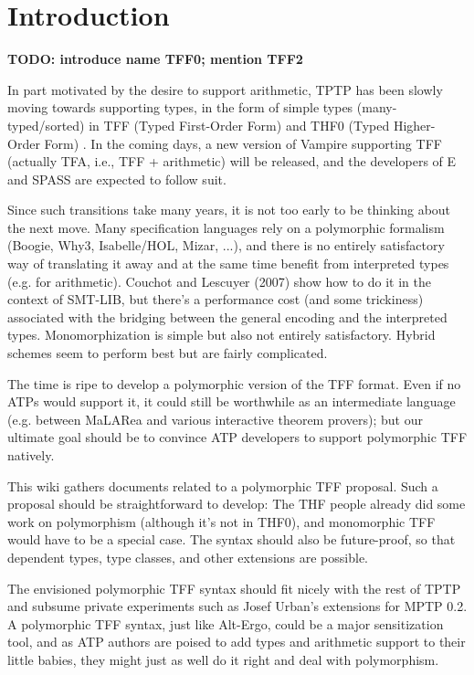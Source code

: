 \section{Introduction}
\label{sec_intro}

\textbf{TODO: introduce name TFF0; mention TFF2}

In part motivated by the desire to support arithmetic, TPTP has been slowly
moving towards supporting types, in the form of simple types (many-typed/sorted)
in TFF (Typed First-Order Form) \cite{TFF0} and THF0 (Typed Higher-Order Form)
\cite{xxx}. In the coming days, a new version of Vampire supporting TFF
(actually TFA, i.e., TFF + arithmetic) will be released, and the developers of E
and SPASS are expected to follow suit.

Since such transitions take many years, it is not too early to be thinking about
the next move. Many specification languages rely on a polymorphic formalism
(Boogie, Why3, Isabelle/HOL, Mizar, ...), and there is no entirely satisfactory
way of translating it away and at the same time benefit from interpreted types
(e.g. for arithmetic). Couchot and Lescuyer (2007) show how to do it in the
context of SMT-LIB, but there's a performance cost (and some trickiness)
associated with the bridging between the general encoding and the interpreted
types. Monomorphization is simple but also not entirely satisfactory. Hybrid
schemes seem to perform best but are fairly complicated.

The time is ripe to develop a polymorphic version of the TFF format. Even if no
ATPs would support it, it could still be worthwhile as an intermediate language
(e.g. between MaLARea and various interactive theorem provers); but our ultimate
goal should be to convince ATP developers to support polymorphic TFF natively.

This wiki gathers documents related to a polymorphic TFF proposal. Such a
proposal should be straightforward to develop: The THF people already did some
work on polymorphism (although it's not in THF0), and monomorphic TFF would have
to be a special case. The syntax should also be future-proof, so that dependent
types, type classes, and other extensions are possible.

The envisioned polymorphic TFF syntax should fit nicely with the rest of TPTP
and subsume private experiments such as Josef Urban's extensions for MPTP 0.2. A
polymorphic TFF syntax, just like Alt-Ergo, could be a major sensitization tool,
and as ATP authors are poised to add types and arithmetic support to their
little babies, they might just as well do it right and deal with polymorphism.


